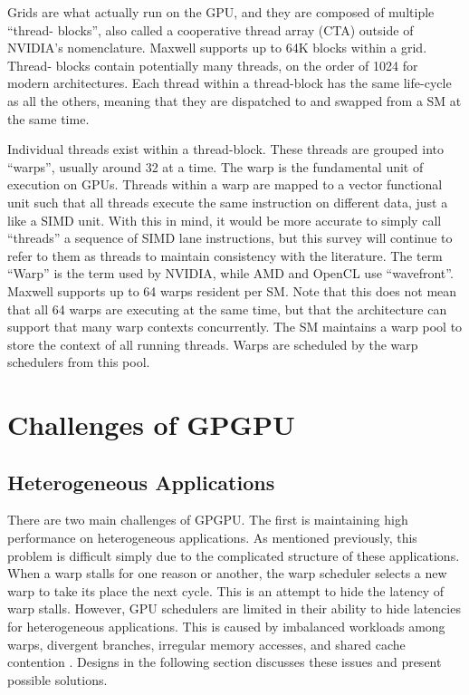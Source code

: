 \documentclass[prodmode,acmtecs]{acmsmall} %
\begin{document}
Grids are what actually run on the GPU, and they are composed of multiple
``thread- blocks'', also called a cooperative thread array (CTA) outside of
NVIDIA's nomenclature. Maxwell supports up to 64K blocks within a grid. Thread-
blocks contain potentially many threads, on the order of 1024 for modern
architectures. Each thread within a thread-block has the same life-cycle as all
the others, meaning that they are dispatched to and swapped from a SM at the
same time.

Individual threads exist within a thread-block. These threads are grouped into
``warps'', usually around 32 at a time. The warp is the fundamental unit of
execution on GPUs. Threads within a warp are mapped to a vector functional unit
such that all threads execute the same instruction on different data, just a
like a SIMD unit. With this in mind, it would be more accurate to simply call
``threads'' a sequence of SIMD lane instructions, but this survey will continue
to refer to them as threads to maintain consistency with the literature. The
term ``Warp'' is the term used by NVIDIA, while AMD and OpenCL use
``wavefront''. Maxwell supports up to 64 warps resident per SM. Note that this
does not mean that all 64 warps are executing at the same time, but that the
architecture can support that many warp contexts concurrently. The SM maintains
a warp pool to store the context of all running threads. Warps are scheduled by
the warp schedulers from this pool.

\section{Challenges of GPGPU} \label{sec:challenges}
\subsection{Heterogeneous Applications}
There are two main challenges of GPGPU. The first is maintaining high
performance on heterogeneous applications. As mentioned previously, this problem
is difficult simply due to the complicated structure of these applications. When
a warp stalls for one reason or another, the warp scheduler selects a new warp
to take its place the next cycle. This is an attempt to hide the latency of warp
stalls. However, GPU schedulers are limited in their ability to hide latencies
for heterogeneous applications. This is caused by imbalanced workloads among
warps, divergent branches, irregular memory accesses, and shared cache
contention \cite{CoordinatedWarpScheduling}. Designs in the following section
discusses these issues and present possible solutions.
\end{document}

